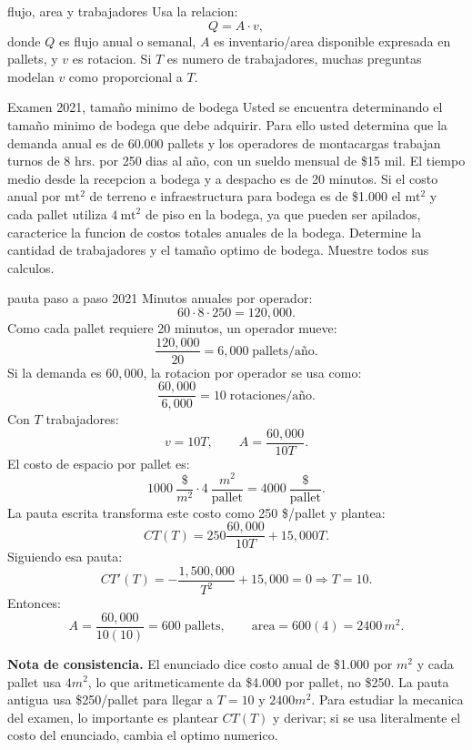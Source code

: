 \begin{materia}{flujo, area y trabajadores}
Usa la relacion:
\[
  Q=A\cdot v,
\]
donde $Q$ es flujo anual o semanal, $A$ es inventario/area disponible expresada en pallets, y $v$ es rotacion. Si $T$ es numero de trabajadores, muchas preguntas modelan $v$ como proporcional a $T$.
\end{materia}

\begin{enunciado}{Examen 2021, tamaño minimo de bodega}
Usted se encuentra determinando el tamaño minimo de bodega que debe adquirir. Para ello usted determina que la demanda anual es de 60.000 pallets y los operadores de montacargas trabajan turnos de 8 hrs. por 250 dias al año, con un sueldo mensual de \$15 mil. El tiempo medio desde la recepcion a bodega y a despacho es de 20 minutos. Si el costo anual por $\text{mt}^2$ de terreno e infraestructura para bodega es de \$1.000 el $\text{mt}^2$ y cada pallet utiliza $4\ \text{mt}^2$ de piso en la bodega, ya que pueden ser apilados, caracterice la funcion de costos totales anuales de la bodega. Determine la cantidad de trabajadores y el tamaño optimo de bodega. Muestre todos sus calculos.
\end{enunciado}

\begin{pautacompleta}{pauta paso a paso 2021}
Minutos anuales por operador:
\[
  60\cdot 8\cdot 250=120{,}000.
\]
Como cada pallet requiere 20 minutos, un operador mueve:
\[
  \frac{120{,}000}{20}=6{,}000\;\text{pallets/año}.
\]
Si la demanda es $60{,}000$, la rotacion por operador se usa como:
\[
  \frac{60{,}000}{6{,}000}=10\;\text{rotaciones/año}.
\]
Con $T$ trabajadores:
\[
  v=10T,\qquad A=\frac{60{,}000}{10T}.
\]
El costo de espacio por pallet es:
\[
  1000\ \frac{\$}{m^2}\cdot 4\ \frac{m^2}{\text{pallet}}
  =4000\ \frac{\$}{\text{pallet}}.
\]
La pauta escrita transforma este costo como 250 \$/pallet y plantea:
\[
  CT(T)=250\frac{60{,}000}{10T}+15{,}000T.
\]
Siguiendo esa pauta:
\[
  CT'(T)=-\frac{1{,}500{,}000}{T^2}+15{,}000=0
  \Rightarrow T=10.
\]
Entonces:
\[
  A=\frac{60{,}000}{10(10)}=600\;\text{pallets},
  \qquad
  \text{area}=600(4)=2400\,m^2.
\]

\textbf{Nota de consistencia.} El enunciado dice costo anual de \$1.000 por $m^2$ y cada pallet usa $4m^2$, lo que aritmeticamente da \$4.000 por pallet, no \$250. La pauta antigua usa \$250/pallet para llegar a $T=10$ y $2400m^2$. Para estudiar la mecanica del examen, lo importante es plantear $CT(T)$ y derivar; si se usa literalmente el costo del enunciado, cambia el optimo numerico.
\end{pautacompleta}
